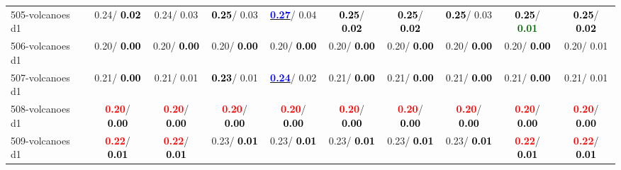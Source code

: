 \begin{table}[h]
\begin{center}
{\begin{tabular}{lc|c|c|c|c|c|c|c|c}
505-volcanoes d1 &   0.24/\textcolor{black}{\textbf{  0.02}} &   0.24/  0.03 & \textcolor{black}{\textbf{  0.25}}/  0.03 & \underline{\textcolor{blue}{\textbf{  0.27}}}/  0.04 & \textcolor{black}{\textbf{  0.25}}/\textcolor{black}{\textbf{  0.02}} & \textcolor{black}{\textbf{  0.25}}/\textcolor{black}{\textbf{  0.02}} & \textcolor{black}{\textbf{  0.25}}/  0.03 & \textcolor{black}{\textbf{  0.25}}/\textcolor{darkgreen}{\textbf{  0.01}} & \textcolor{black}{\textbf{  0.25}}/\textcolor{black}{\textbf{  0.02}} \\
506-volcanoes d1 &   0.20/\textcolor{black}{\textbf{  0.00}} &   0.20/\textcolor{black}{\textbf{  0.00}} &   0.20/\textcolor{black}{\textbf{  0.00}} &   0.20/\textcolor{black}{\textbf{  0.00}} &   0.20/\textcolor{black}{\textbf{  0.00}} &   0.20/\textcolor{black}{\textbf{  0.00}} &   0.20/\textcolor{black}{\textbf{  0.00}} &   0.20/\textcolor{black}{\textbf{  0.00}} &   0.20/  0.01 \\
507-volcanoes d1 &   0.21/\textcolor{black}{\textbf{  0.00}} &   0.21/  0.01 & \textcolor{black}{\textbf{  0.23}}/  0.01 & \underline{\textcolor{blue}{\textbf{  0.24}}}/  0.02 &   0.21/\textcolor{black}{\textbf{  0.00}} &   0.21/\textcolor{black}{\textbf{  0.00}} &   0.21/\textcolor{black}{\textbf{  0.00}} &   0.21/\textcolor{black}{\textbf{  0.00}} &   0.21/  0.01 \\
508-volcanoes d1 & \textcolor{red}{\textbf{  0.20}}/\textcolor{black}{\textbf{  0.00}} & \textcolor{red}{\textbf{  0.20}}/\textcolor{black}{\textbf{  0.00}} & \textcolor{red}{\textbf{  0.20}}/\textcolor{black}{\textbf{  0.00}} & \textcolor{red}{\textbf{  0.20}}/\textcolor{black}{\textbf{  0.00}} & \textcolor{red}{\textbf{  0.20}}/\textcolor{black}{\textbf{  0.00}} & \textcolor{red}{\textbf{  0.20}}/\textcolor{black}{\textbf{  0.00}} & \textcolor{red}{\textbf{  0.20}}/\textcolor{black}{\textbf{  0.00}} & \textcolor{red}{\textbf{  0.20}}/\textcolor{black}{\textbf{  0.00}} & \textcolor{red}{\textbf{  0.20}}/\textcolor{black}{\textbf{  0.00}} \\ \hline
509-volcanoes d1 & \textcolor{red}{\textbf{  0.22}}/\textcolor{black}{\textbf{  0.01}} & \textcolor{red}{\textbf{  0.22}}/\textcolor{black}{\textbf{  0.01}} &   0.23/\textcolor{black}{\textbf{  0.01}} &   0.23/\textcolor{black}{\textbf{  0.01}} &   0.23/\textcolor{black}{\textbf{  0.01}} &   0.23/\textcolor{black}{\textbf{  0.01}} &   0.23/\textcolor{black}{\textbf{  0.01}} & \textcolor{red}{\textbf{  0.22}}/\textcolor{black}{\textbf{  0.01}} & \textcolor{red}{\textbf{  0.22}}/\textcolor{black}{\textbf{  0.01}} \\

\end{tabular}}
\end{center}
\end{table}
